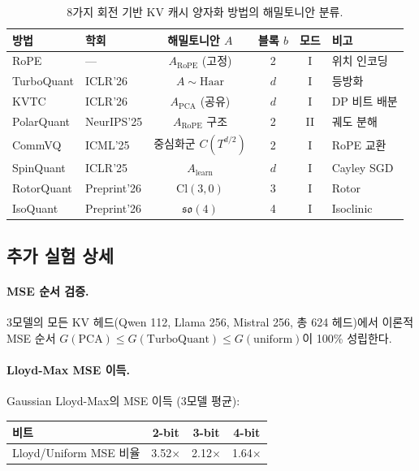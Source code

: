 \begin{table}[h]
\centering
\caption{8가지 회전 기반 KV 캐시 양자화 방법의 해밀토니안 분류.}
\label{tab:hamiltonian_full}
\small
\begin{tabular}{@{}llcccl@{}}
\toprule
방법 & 학회 & 해밀토니안 $A$ & 블록 $b$ & 모드 & 비고 \\
\midrule
RoPE & --- & $A_{\mathrm{RoPE}}$ (고정) & 2 & I & 위치 인코딩 \\
TurboQuant \citep{zandieh2025turboquant} & ICLR'26 & $A \sim \mathrm{Haar}$ & $d$ & I & 등방화 \\
KVTC \citep{staniszewski2025kvtc} & ICLR'26 & $A_{\mathrm{PCA}}$ (공유) & $d$ & I & DP 비트 배분 \\
PolarQuant \citep{wu2025polarquant} & NeurIPS'25 & $A_{\mathrm{RoPE}}$ 구조 & 2 & II & 궤도 분해 \\
CommVQ \citep{li2025commvq} & ICML'25 & 중심화군 $C(T^{d/2})$ & 2 & I & RoPE 교환 \\
SpinQuant \citep{liu2024spinquant} & ICLR'25 & $A_{\mathrm{learn}}$ & $d$ & I & Cayley SGD \\
RotorQuant \citep{scrya2026rotorquant} & Preprint'26 & $\mathrm{Cl}(3,0)$ & 3 & I & Rotor \\
IsoQuant \citep{chen2026isoquant} & Preprint'26 & $\mathfrak{so}(4)$ & 4 & I & Isoclinic \\
\bottomrule
\end{tabular}
\end{table}

\subsection{추가 실험 상세}

\paragraph{MSE 순서 검증.}
3모델의 모든 KV 헤드(Qwen 112, Llama 256, Mistral 256, 총 624 헤드)에서 이론적 MSE 순서 $G(\mathrm{PCA}) \leq G(\mathrm{TurboQuant}) \leq G(\mathrm{uniform})$이 100\% 성립한다.

\paragraph{Lloyd-Max MSE 이득.}
Gaussian Lloyd-Max의 MSE 이득 (3모델 평균):

\begin{center}
\begin{tabular}{@{}lccc@{}}
\toprule
비트 & 2-bit & 3-bit & 4-bit \\
\midrule
Lloyd/Uniform MSE 비율 & 3.52$\times$ & 2.12$\times$ & 1.64$\times$ \\
\bottomrule
\end{tabular}
\end{center}

